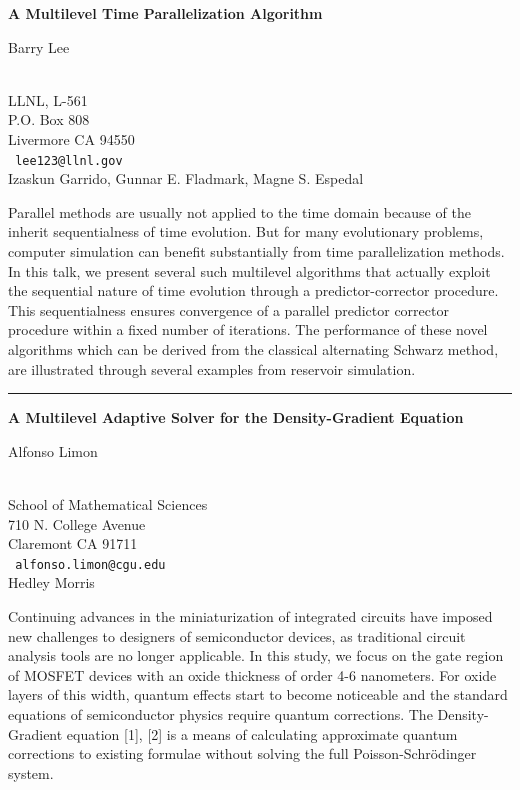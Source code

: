 \documentclass[twosided]{report}
\begin{document}
\begin{center}
{\large			\label{lee}
{\bf
A Multilevel Time Parallelization Algorithm
}

Barry Lee} \\
LLNL, L-561 \\ P.O. Box 808 \\ Livermore CA 94550
\\ {\tt
lee123@llnl.gov
}
\\
Izaskun Garrido,
Gunnar E. Fladmark,
Magne S. Espedal
\end{center}

Parallel methods are usually not applied to the time domain because of
the inherit sequentialness of time evolution. But for many evolutionary
problems, computer simulation can benefit substantially from time
parallelization methods. In this talk, we present several such
multilevel algorithms that actually exploit the sequential nature of
time evolution through a predictor-corrector procedure. This
sequentialness ensures convergence of a parallel predictor corrector
procedure within a fixed number of iterations. The performance of these
novel algorithms which can be derived from the classical alternating
Schwarz method, are illustrated through several examples from reservoir
simulation.


\begin{center}

\rule{6in}{1pt}
\end{center}

\begin{center}
{\large			\label{limon}
{\bf
A Multilevel Adaptive Solver for the Density-Gradient Equation
}

Alfonso Limon} \\
School of Mathematical Sciences
\\
710 N. College Avenue
\\
Claremont CA 91711
\\ {\tt
alfonso.limon@cgu.edu
}
\\
Hedley Morris
\end{center}

Continuing advances in the miniaturization of integrated circuits have
imposed new challenges to designers of semiconductor devices, as
traditional circuit analysis tools are no longer applicable. In this
study, we focus on the gate region of MOSFET devices with an oxide
thickness of order 4-6 nanometers. For oxide layers of this width,
quantum effects start to become noticeable and the standard equations
of semiconductor physics require quantum corrections. The
Density-Gradient equation [1], [2] is a means of calculating
approximate quantum corrections to existing formulae without solving
the full Poisson-Schr\"{o}dinger system.
\end{document}
